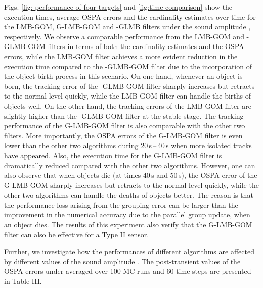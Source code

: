 \documentclass[journal]{IEEEtran}
\begin{document}
{Figs. \ref{fig: performance of four targets} and \ref{fig:time comparison} show the execution times, average OSPA errors and the cardinality estimates over time for the LMB-GOM, G-LMB-GOM and -GLMB filters under the sound amplitude , respectively. We observe a comparable performance from the LMB-GOM and -GLMB-GOM filters  in terms of both the cardinality estimates and the OSPA errors, while the LMB-GOM filter achieves a more evident reduction in the execution time compared to  the -GLMB-GOM filter  due to the incorporation of the object birth process in this scenario. On one hand, whenever an object is born, the tracking error of the -GLMB-GOM filter  sharply increases but retracts to the normal level quickly, while the LMB-GOM filter can handle the births of objects well.  On the other hand, the tracking errors of the LMB-GOM filter are slightly higher than the -GLMB-GOM filter at the stable stage.   The tracking performance of the G-LMB-GOM filter is also comparable with the other two filters. More importantly, the OSPA errors  of the G-LMB-GOM filter is even lower than the other two algorithms during 20\,s\,--\,40\,s when more isolated  tracks have appeared. Also, the execution time for the G-LMB-GOM filter is dramatically reduced compared with the other two algorithms. However, one can also observe that when objects die (at times 40\,s and 50\,s), the OSPA error of the G-LMB-GOM sharply increases but retracts to the normal level quickly, while the other two algorithms can handle the deaths of objects better. 
The reason is that 
the performance loss arising from the grouping error can be larger than the improvement in the numerical accuracy due to the parallel group update, when an object dies.
The results of this experiment also verify that the G-LMB-GOM filter can also be effective for a Type II sensor.

Further,  we investigate how the performances of different algorithms are affected by  different values of the sound amplitude . The  post-transient values of the OSPA errors under  averaged over 100 MC runs and 60 time steps are presented in Table III.



 

}
\end{document}
